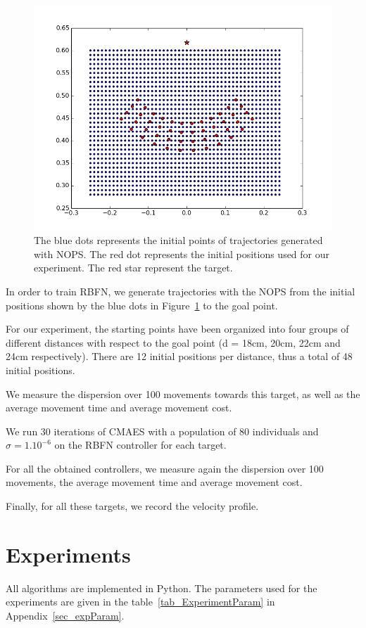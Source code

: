 \documentclass[pdftex,a4paper,12pt]{report}
\begin{document}
\begin{figure}
\centering
\includegraphics[scale=0.5]{figures/NOPStrainingPoint.png}
\caption{The blue dots represents the initial points of trajectories generated with NOPS. The red dot represents the initial positions used for our experiment. The red star represent the target.}
\label{fig:trainingPointForRBFN}
\end{figure}

In order to train RBFN, we generate trajectories with the NOPS from the initial positions shown by the blue dots in Figure~\ref{fig:trainingPointForRBFN} to the goal point.

For our experiment, the starting points have been organized into four groups of different distances with respect to the goal point (d = 18cm, 20cm, 22cm and 24cm respectively). There are 12 initial positions per distance, thus a total of 48 initial positions.

We measure the dispersion over 100 movements towards this target, as well as the average movement time and average movement cost.

We run 30 iterations of CMAES with a population of 80 individuals and $\sigma = 1.10^{-6}$ on the RBFN controller for each target.

For all the obtained controllers, we measure again the dispersion over 100 movements, the average movement time and average movement cost.

Finally, for all these targets, we record the velocity profile.

\section{Experiments}
All algorithms are implemented in Python. The parameters used for the experiments are given in the table~\ref{tab_ExperimentParam} in Appendix~\ref{sec_expParam}.
\end{document}
